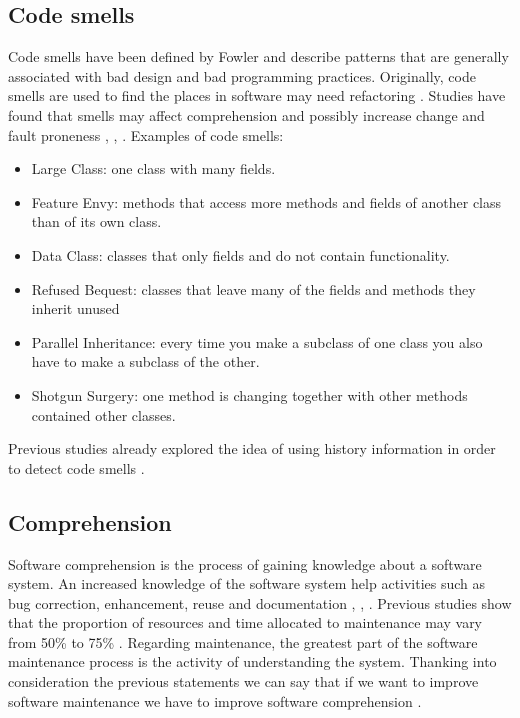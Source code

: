 \subsection{Code smells }
Code smells have been defined by Fowler \cite{bookFowler} and describe patterns that are generally associated with bad design and bad programming practices.
Originally, code smells are used to find the places in software may need refactoring \cite{articlesmells}. Studies have found that smells may affect comprehension and possibly increase change and fault proneness \cite{5741260}, \cite{5328703}, \cite{articlefault-proneness}.
Examples of code smells:
\begin{itemize}
	\item Large Class: one class with many fields.
	\item Feature Envy:  methods that access more methods and fields of another class than of its own class.
	\item Data Class: classes that only fields and do not contain functionality.
	\item Refused Bequest: classes that leave many of the fields and methods they inherit unused
	\item Parallel Inheritance: every time you make a subclass of one class you also have to make a subclass of the other.
	\item Shotgun Surgery: one method is changing together with other methods contained other classes.
\end{itemize}

Previous studies already explored the idea of using history information in order to detect code smells \cite{6963448}. 

\subsection{Comprehension}
Software comprehension is the process of gaining knowledge about a software system.
An increased knowledge of the software system help activities such as bug correction, enhancement, reuse and documentation \cite{Comprehension}, \cite{1199197}, \cite{2003:XLC:851042.857028}.
Previous studies show that the proportion of resources and time allocated to maintenance may vary from 50\% to 75\% \cite{articleLientz}.
Regarding maintenance, the greatest part of the software maintenance process is the activity of understanding the
system. 
Thanking into consideration the previous statements we can say that if we want to improve software maintenance we have to improve software comprehension \cite{article-cognitive-processes}.

